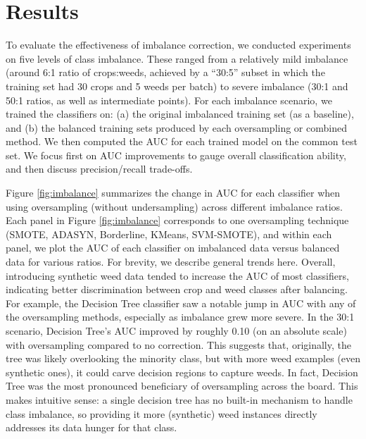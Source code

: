 \documentclass[agriengineering,article,submit,pdftex,moreauthors]{Definitions/mdpi}
\begin{document}
\section{Results}
\label{section:results}
To evaluate the effectiveness of imbalance correction, we conducted experiments on five levels of class imbalance. These ranged from a relatively mild imbalance (around 6:1 ratio of crops:weeds, achieved by a “30:5” subset in which the training set had 30 crops and 5 weeds per batch) to severe imbalance (30:1 and 50:1 ratios, as well as intermediate points). For each imbalance scenario, we trained the classifiers on: (a) the original imbalanced training set (as a baseline), and (b) the balanced training sets produced by each oversampling or combined method. We then computed the AUC for each trained model on the common test set. We focus first on AUC improvements to gauge overall classification ability, and then discuss precision/recall trade-offs.

Figure \ref{fig:imbalance} summarizes the change in AUC for each classifier when using oversampling (without undersampling) across different imbalance ratios. Each panel in Figure \ref{fig:imbalance} corresponds to one oversampling technique (SMOTE, ADASYN, Borderline, KMeans, SVM-SMOTE), and within each panel, we plot the AUC of each classifier on imbalanced data versus balanced data for various ratios. For brevity, we describe general trends here. Overall, introducing synthetic weed data tended to increase the AUC of most classifiers, indicating better discrimination between crop and weed classes after balancing. For example, the Decision Tree classifier saw a notable jump in AUC with any of the oversampling methods, especially as imbalance grew more severe. In the 30:1 scenario, Decision Tree’s AUC improved by roughly 0.10 (on an absolute scale) with oversampling compared to no correction. This suggests that, originally, the tree was likely overlooking the minority class, but with more weed examples (even synthetic ones), it could carve decision regions to capture weeds. In fact, Decision Tree was the most pronounced beneficiary of oversampling across the board. This makes intuitive sense: a single decision tree has no built-in mechanism to handle class imbalance, so providing it more (synthetic) weed instances directly addresses its data hunger for that class.
\end{document}
